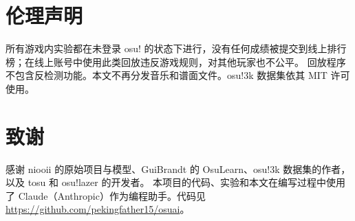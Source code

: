 \documentclass[11pt,a4paper,fontset=windows]{ctexart}
\begin{document}
\section{伦理声明}
所有游戏内实验都在未登录 osu! 的状态下进行，没有任何成绩被提交到线上排行榜；在线上账号中使用此类回放违反游戏规则，对其他玩家也不公平。
回放程序不包含反检测功能。本文不再分发音乐和谱面文件。osu!3k 数据集依其 MIT 许可使用。

\section*{致谢}
感谢 niooii 的原始项目与模型、GuiBrandt 的 OsuLearn、osu!3k 数据集的作者，以及 tosu 和 osu!lazer 的开发者。
本项目的代码、实验和本文在编写过程中使用了 Claude（Anthropic）作为编程助手。代码见 \url{https://github.com/pekingfather15/osuai}。

\newpage
\renewcommand{\refname}{参考文献}

\end{document}
